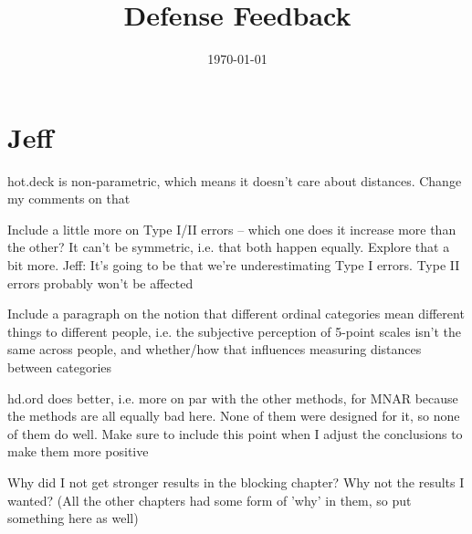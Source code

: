 \documentclass[12pt]{article}
\title{Defense Feedback}
\date{\today}
\begin{document}
\maketitle

\section*{Jeff}
	\begin{coi}
		\item hot.deck is non-parametric, which means it doesn't care about distances. Change my comments on that
		\item Include a little more on Type I/II errors -- which one does it increase more than the other? It can't be symmetric, i.e. that both happen equally. Explore that a bit more. Jeff: It's going to be that we're underestimating Type I errors. Type II errors probably won't be affected
		\item Include a paragraph on the notion that different ordinal categories mean different things to different people, i.e. the subjective perception of 5-point scales isn't the same across people, and whether/how that influences measuring distances between categories
		\item hd.ord does better, i.e. more on par with the other methods, for MNAR because the methods are all equally bad here. None of them were designed for it, so none of them do well. Make sure to include this point when I adjust the conclusions to make them more positive
		\item Why did I not get stronger results in the blocking chapter? Why not the results I wanted? (All the other chapters had some form of 'why' in them, so put something here as well)
	\end{coi}
\end{document}
